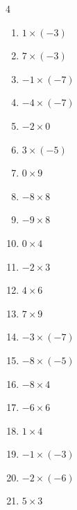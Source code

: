 \begin{multicols}{4}
\begin{enumerate}
  \item $1\times (-3)$
        \phantom{$=-3$}

  \item $7\times (-3)$
        \phantom{$=-21$}

  \item $-1\times (-7)$
        \phantom{$=7$}

  \item $-4\times (-7)$
        \phantom{$=28$}

  \item $-2\times 0$
        \phantom{$=0$}

  \item $3\times (-5)$
        \phantom{$=-15$}

  \item $0\times 9$
        \phantom{$=0$}

  \item $-8\times 8$
        \phantom{$=-64$}

  \item $-9\times 8$
        \phantom{$=-72$}

  \item $0\times 4$
        \phantom{$=0$}

  \item $-2\times 3$
        \phantom{$=-6$}

  \item $4\times 6$
        \phantom{$=24$}

  \item $7\times 9$
        \phantom{$=63$}

  \item $-3\times (-7)$
        \phantom{$=21$}

  \item $-8\times (-5)$
        \phantom{$=40$}

  \item $-8\times 4$
        \phantom{$=-32$}

  \item $-6\times 6$
        \phantom{$=-36$}

  \item $1\times 4$
        \phantom{$=4$}

  \item $-1\times (-3)$
        \phantom{$=3$}

  \item $-2\times (-6)$
        \phantom{$=12$}

\columnbreak %

  \item $5\times 3$
        \phantom{$=15$}


\end{enumerate}
\end{multicols}
